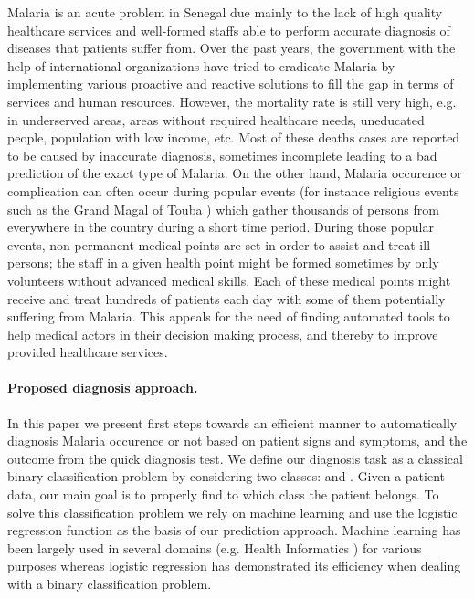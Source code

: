 Malaria is an acute problem in Senegal  due mainly to the lack of high quality healthcare services and well-formed
staffs able to perform accurate diagnosis of diseases that patients suffer from. Over the past years, the government with 
the help of international organizations have tried to eradicate Malaria by implementing various proactive and reactive solutions 
to fill the gap in terms of services and human resources. However, the mortality rate is still very high, e.g. in underserved areas,
areas without required healthcare needs, uneducated people, population with low income, etc. Most of these deaths cases are reported to be caused by inaccurate diagnosis, sometimes 
incomplete leading to a bad prediction of the exact type of Malaria.
On the other hand, Malaria occurence or complication can often occur during  popular events (for instance religious events such as the Grand Magal of Touba \cite{So17})
which gather thousands of persons from everywhere in the country during a short time period. During those popular events, non-permanent medical points are set in order
to assist and treat ill persons; the staff in a given health point might be formed sometimes by only volunteers without advanced medical skills. Each of these medical 
points might receive and treat hundreds of patients each day with some of them potentially suffering from Malaria. 
This appeals for the need of finding automated tools to help medical actors in their decision making process, and thereby to improve provided 
healthcare services.   

\paragraph*{Proposed diagnosis approach.}
In this paper we present first steps towards an efficient manner to automatically diagnosis Malaria occurence or not based on patient signs and symptoms,
and the outcome from the quick diagnosis test. We define our diagnosis task as a classical binary classification problem by considering two classes:  and .
Given a patient data, our main goal is to properly find to which class the patient belongs. To solve this classification problem we rely on machine learning and use the logistic regression
function as the basis of our prediction approach. Machine learning has been largely used in several domains (e.g. Health Informatics  \cite{Du13}) for various purposes whereas logistic regression has demonstrated its efficiency when dealing with a binary classification problem. 
 
